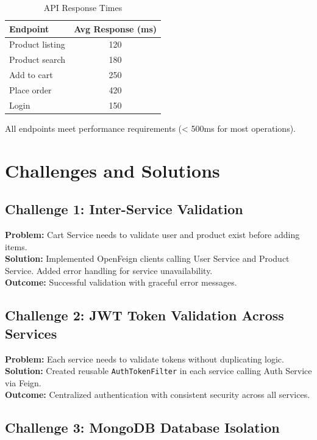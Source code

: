 \begin{table}[h!]
\centering
\caption{API Response Times}
\begin{tabular}{|l|c|}
\hline
\textbf{Endpoint} & \textbf{Avg Response (ms)} \\
\hline
Product listing & 120 \\
Product search & 180 \\
Add to cart & 250 \\
Place order & 420 \\
Login & 150 \\
\hline
\end{tabular}
\end{table}

All endpoints meet performance requirements (< 500ms for most operations).

\section{Challenges and Solutions}

\subsection{Challenge 1: Inter-Service Validation}

\textbf{Problem:} Cart Service needs to validate user and product exist before adding items.\\
\textbf{Solution:} Implemented OpenFeign clients calling User Service and Product Service. Added error handling for service unavailability.\\
\textbf{Outcome:} Successful validation with graceful error messages.

\subsection{Challenge 2: JWT Token Validation Across Services}

\textbf{Problem:} Each service needs to validate tokens without duplicating logic.\\
\textbf{Solution:} Created reusable \texttt{AuthTokenFilter} in each service calling Auth Service via Feign.\\
\textbf{Outcome:} Centralized authentication with consistent security across all services.

\subsection{Challenge 3: MongoDB Database Isolation}

